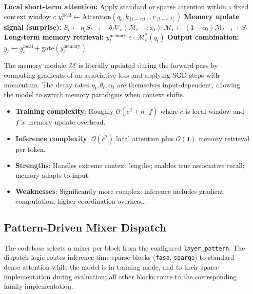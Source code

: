 \begin{algorithmic}[1]
\State \textbf{Local short-term attention:} Apply standard or sparse attention within a fixed context window $c$
\State $y_t^{\text{local}} \gets \text{Attention}(q_t, k_{[t-c:t]}, v_{[t-c:t]})$
\State \textbf{Memory update signal (surprise):}
\State $S_t \gets \eta_t S_{t-1} - \theta_t \nabla_\ell(\mathcal{M}_{t-1}; x_t)$ 
\State $\mathcal{M}_t \gets (1 - \alpha_t) \mathcal{M}_{t-1} + S_t$ 
\State \textbf{Long-term memory retrieval:}
\State $y_t^{\text{memory}} \gets \mathcal{M}_t^* (q_t)$ 
\State \textbf{Output combination:}
\State $y_t \gets y_t^{\text{local}} + \text{gate}(y_t^{\text{memory}})$ 
\end{algorithmic}

The memory module $\mathcal{M}$ is literally updated during the forward pass by computing gradients of an associative loss and applying SGD steps with momentum. The decay rates $\eta_t, \theta_t, \alpha_t$ are themselves input-dependent, allowing the model to switch memory paradigms when context shifts.

\begin{itemize}[leftmargin=*]
    \item \textbf{Training complexity}: Roughly $\mathcal{O}(c^2 + n \cdot f)$ where $c$ is local window and $f$ is memory update overhead.
    \item \textbf{Inference complexity}: $\mathcal{O}(c^2)$ local attention plus $\mathcal{O}(1)$ memory retrieval per token.
    \item \textbf{Strengths}: Handles extreme context lengths; enables true associative recall; memory adapts to input.
    \item \textbf{Weaknesses}: Significantly more complex; inference includes gradient computation; higher coordination overhead.
\end{itemize}

\subsection{Pattern-Driven Mixer Dispatch}

The codebase selects a mixer per block from the configured \texttt{layer\_pattern}. The dispatch logic routes inference-time sparse blocks (\texttt{fasa}, \texttt{sparge}) to standard dense attention while the model is in training mode, and to their sparse implementation during evaluation; all other blocks route to the corresponding family implementation.

